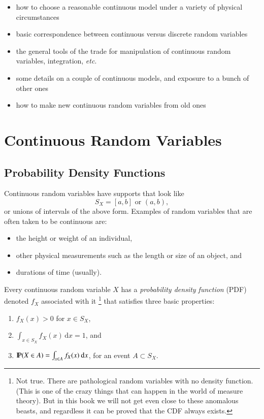 \documentclass[captions=tableheading]{scrbook}
\begin{document}
\begin{itemize}
\item how to choose a reasonable continuous model under a variety of physical circumstances
\item basic correspondence between continuous versus discrete random variables
\item the general tools of the trade for manipulation of continuous random variables, integration, \emph{etc}.
\item some details on a couple of continuous models, and exposure to a bunch of other ones
\item how to make new continuous random variables from old ones
\end{itemize}
\section{Continuous Random Variables}
\label{sec-6-1}

\label{sec:continuous-random-variables}
\subsection{Probability Density Functions}
\label{sec-6-1-1}

\label{sub:probability-density-functions}

Continuous random variables have supports that look like
\begin{equation}
S_{X}=[a,b]\mbox{ or }(a,b),
\end{equation}
or unions of intervals of the above form. Examples of random variables that are often taken to be continuous are:

\begin{itemize}
\item the height or weight of an individual,
\item other physical measurements such as the length or size of an object, and
\item durations of time (usually).
\end{itemize}

Every continuous random variable \(X\) has a \emph{probability density function} (PDF) denoted \(f_{X}\) associated with it
\footnote{Not true. There are pathological random variables with no density function. (This is one of the crazy things that can happen in the world of measure theory). But in this book we will not get even close to these anomalous beasts, and regardless it can be proved that the CDF always exists.}
that satisfies three basic properties:
\begin{enumerate}
\item \(f_{X}(x)>0\) for \(x\in S_{X}\),
\item \(\int_{x\in S_{X}}f_{X}(x)\,\mathrm{d} x=1\), and
\item \(\P(X\in A)=\int_{x\in A}f_{X}(x)\:\mathrm{d} x\), for an event \(A\subset S_{X}\).
\end{enumerate}
\label{enu: contrvcond3}
\end{document}
